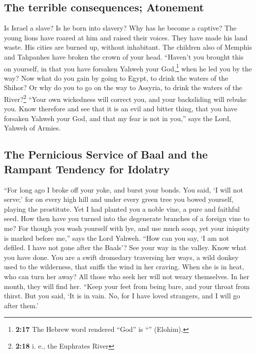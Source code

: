 \hypertarget{the-terrible-consequences-atonement}{%
\subsection{The terrible consequences;
Atonement}\label{the-terrible-consequences-atonement}}

 Is Israel a slave? Is he born into slavery? Why has he
become a captive?  The young lions have roared at him and
raised their voices. They have made his land waste. His cities are
burned up, without inhabitant.  The children also of
Memphis and Tahpanhes have broken the crown of your head.
 ``Haven't you brought this on yourself, in that you have
forsaken Yahweh your God,\footnote{\textbf{2:17} The Hebrew word
  rendered ``God'' is ``'' (Elohim).} when he led you by
the way?  Now what do you gain by going to Egypt, to
drink the waters of the Shihor? Or why do you to go on the way to
Assyria, to drink the waters of the River?\footnote{\textbf{2:18} i. e.,
  the Euphrates River}  ``Your own wickedness will
correct you, and your backsliding will rebuke you. Know therefore and
see that it is an evil and bitter thing, that you have forsaken Yahweh
your God, and that my fear is not in you,'' says the Lord, Yahweh of
Armies.

\hypertarget{the-pernicious-service-of-baal-and-the-rampant-tendency-for-idolatry}{%
\subsection{The Pernicious Service of Baal and the Rampant Tendency for
Idolatry}\label{the-pernicious-service-of-baal-and-the-rampant-tendency-for-idolatry}}

 ``For long ago I broke off your yoke, and burst your
bonds. You said, `I will not serve;' for on every high hill and under
every green tree you bowed yourself, playing the prostitute.
 Yet I had planted you a noble vine, a pure and faithful
seed. How then have you turned into the degenerate branches of a foreign
vine to me?  For though you wash yourself with lye, and
use much soap, yet your iniquity is marked before me,'' says the Lord
Yahweh.  ``How can you say, `I am not defiled. I have not
gone after the Baals'? See your way in the valley. Know what you have
done. You are a swift dromedary traversing her ways,  a
wild donkey used to the wilderness, that sniffs the wind in her craving.
When she is in heat, who can turn her away? All those who seek her will
not weary themselves. In her month, they will find her. 
``Keep your feet from being bare, and your throat from thirst. But you
said, `It is in vain. No, for I have loved strangers, and I will go
after them.'

